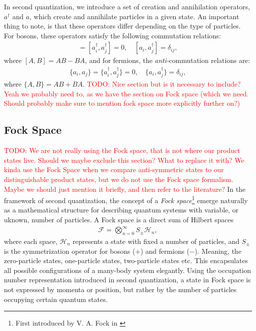 \documentclass{subfiles}
\begin{document}
In second quantization, we introduce a set of creation and annihilation operators, $a^\dagger$ and $a$, which create and annihilate particles in a given state. An important thing to note, is that these operators differ depending on the type of particles. For bosons, these operators satisfy the following commutation relations:
\begin{align}
    [a_i, a_j] = [a^\dagger_i, a^\dagger_j] = 0, \quad [a_i, a^\dagger_j] = \delta_{ij}\label{eq:commutation},
\end{align}
where $[A, B] = AB - BA$, and for fermions, the \emph{anti-}commutation relations are:
\begin{align}
    \{a_i, a_j\} = \{a^\dagger_i, a^\dagger_j\} = 0, \quad \{a_i, a^\dagger_j\} = \delta_{ij}\label{eq:anti_commutation},
\end{align}
where $\{A, B\} = AB + BA$.
\textcolor{red}{TODO: Nice section but is it necessary to include? Yeah we probably need to, as we have the section on Fock space (which we need. Should probably make sure to mention fock space more explicitly further on?)}
\subsection{Fock Space}\textcolor{red}{TODO: We are not really using the Fock space, that is not where our product states live. Should we maybe exclude this section? What to replace it with? We kinda use the Fock Space when we compare anti-symmetric states to our distinguishable product states, but we do not use the Fock space formalism. Maybe we should just mention it briefly, and then refer to the literature?}
In the framework of second quantization, the concept of a \emph{Fock space}\footnote{First introduced by V. A. Fock in \cite{fock1932konfigurationsraum}} emerge naturally as a mathematical structure for describing quantum systems with variable, or uknown, number of particles. A Fock space is a direct sum of Hilbert spaces
\begin{align*}
    \mathcal{F} = \bigotimes_{n=0}^\infty S_{\pm} \mathcal{H}_n,
\end{align*}
where each space, $\mathcal{H}_n$ represents a state with fixed a number of particles, and $S_{\pm}$ is the symmetrization operator for bosons ($+$) and fermions ($-$). Meaning, the zero-particle states, one-particle states, two-particle states etc. This encapsulates all possible configurations of a many-body system elegantly. Using the occupation number representation introduced in second quantization, a state in Fock space is not expressed by momenta or position, but rather by the number of particles occupying certain quantum states\cite{helgaker2013molecular}. 
\\
\end{document}
